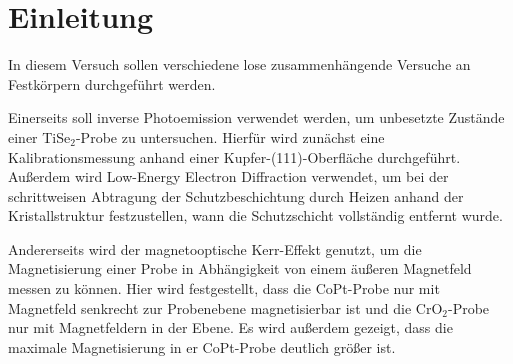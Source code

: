 \section{Einleitung}

  In diesem Versuch sollen verschiedene lose zusammenhängende Versuche an Festkörpern durchgeführt werden.

  Einerseits soll inverse Photoemission verwendet werden, um unbesetzte Zustände einer TiSe$_2$-Probe zu untersuchen.
  Hierfür wird zunächst eine Kalibrationsmessung anhand einer Kupfer-(111)-Oberfläche durchgeführt.
  Außerdem wird Low-Energy Electron Diffraction verwendet, um bei der schrittweisen Abtragung der Schutzbeschichtung durch Heizen anhand der Kristallstruktur festzustellen, wann die Schutzschicht vollständig entfernt wurde.

  Andererseits wird der magnetooptische Kerr-Effekt genutzt, um die Magnetisierung einer Probe in Abhängigkeit von einem äußeren Magnetfeld messen zu können.
  Hier wird festgestellt, dass die CoPt-Probe nur mit Magnetfeld senkrecht zur Probenebene magnetisierbar ist und die CrO$_2$-Probe nur mit Magnetfeldern in der Ebene.
  Es wird außerdem gezeigt, dass die maximale Magnetisierung in er CoPt-Probe deutlich größer ist.
